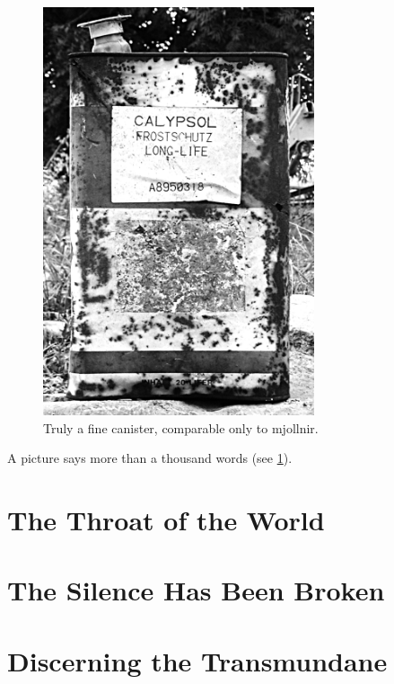 \documentclass[a4paper,11pt]{memoir}
\begin{document}
\begin{figure}
  \includegraphics[width=8cm]{demo}
  \caption{Truly a fine canister, comparable only to \gls{mjollnir}.}
  \label{fig:canister}
\end{figure}

\Blindtext\Blindtext

A picture says more than a thousand words (see \ref{fig:canister}).

\section{The Throat of the World}


\blindtext



\section{The Silence Has Been Broken}

\marginnote{\blindtext}\blindtext


\blindtext

\section{Discerning the Transmundane}
\end{document}
